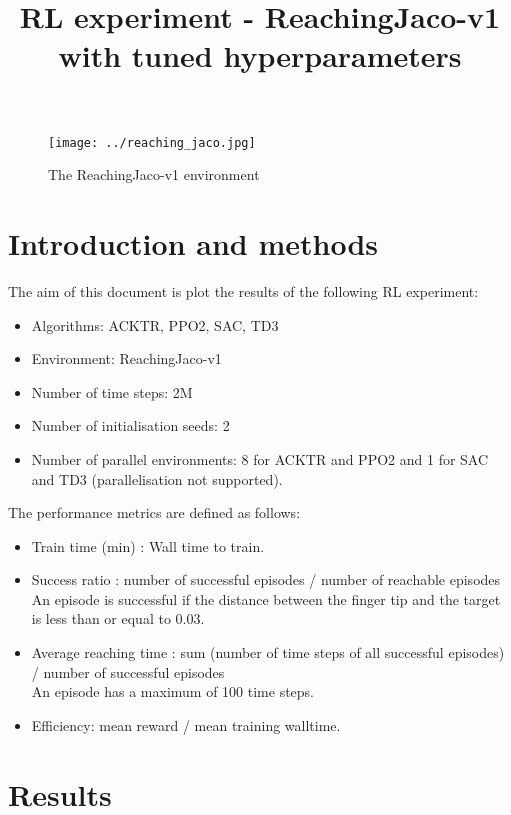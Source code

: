 \documentclass{article}
\title{RL experiment - ReachingJaco-v1 with tuned hyperparameters}
\date{}
\begin{document}
\maketitle


\begin{figure}[H]
    \centering
    \texttt{[image: ../reaching\_jaco.jpg]}
\caption{The ReachingJaco-v1 environment}
\end{figure}



\section{Introduction and methods}


The aim of this document is plot the results of the following RL experiment:

\begin{itemize}
  \item Algorithms: ACKTR, PPO2, SAC, TD3 
  \item Environment: ReachingJaco-v1
  \item Number of time steps: 2M
  \item Number of initialisation seeds: 2
  \item Number of parallel environments: 8 for ACKTR and PPO2 and 1 for SAC and TD3 (parallelisation not supported).
\end{itemize}


The performance metrics are defined as follows:

\begin{itemize}
  \item Train time (min) : Wall time to train.
  \item Success ratio : number of successful episodes / number of reachable episodes \\ 
An episode is successful if the distance between the finger tip and the target is less than or equal to 0.03. \\ 
  \item Average reaching time : sum (number of time steps of all successful episodes) /  number of successful episodes \\ 
An episode has a maximum of 100 time steps.
  \item Efficiency: mean reward / mean training walltime. 
\end{itemize}



\section{Results}
\end{document}
